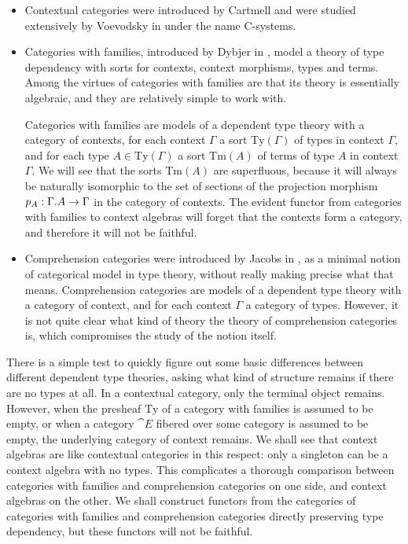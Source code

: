 \begin{itemize}
\item Contextual categories were introduced by Cartmell \cite{Cartmell1986} and were studied
extensively by Voevodsky in \cite{VV_Csys_univ,VV_C-systems_monad,VV_C-systems_quotients}
under the name C-systems.
\item Categories with families, introduced by Dybjer in \cite{Dybjer1996}, model a
theory of type dependency with sorts for contexts, context morphisms, types
and terms. Among the virtues of categories with families are that its theory
is essentially algebraic, and they are relatively simple to work with.

Categories with families are models of a dependent type theory with a
category of contexts, for each context $\Gamma$ a sort $\mathrm{Ty}(\Gamma)$ of
types in context $\Gamma$, and for each type $A\in\mathrm{Ty}(\Gamma)$ a sort
$\mathrm{Tm}(A)$ of terms of type $A$ in context $\Gamma$. We will see that
the sorts $\mathrm{Tm}(A)$ are superfluous, because it will always be 
naturally isomorphic to the set of sections of the projection morphism
$p_A:\ctxext{\Gamma}{A}\to\Gamma$ in the category of contexts. The evident
functor from categories with families to context algebras will forget that the contexts
form a category, and therefore it will not be faithful.
\item Comprehension categories were introduced by Jacobs in \cite{Jacobs1993}, as
a minimal notion of categorical model in type theory, without really making
precise what that means. 
Comprehension categories are models of a dependent type theory with a
category of context, and for each context $\Gamma$ a category of types.
However, it is not quite clear what kind of theory the theory of comprehension
categories is, which compromises the study of the notion itself.
\end{itemize}

There is a simple test to quickly figure out some basic differences between different
dependent type theories, asking what kind of structure remains if there are no
types at all. In a contextual category, only the terminal object remains.
However, when the presheaf $\mathrm{Ty}$ of a category with families is assumed
to be empty, or when a category $\cat{E}$ fibered over some category is assumed
to be empty, the underlying category of context remains. We shall see that
context algebras are like contextual categories in this respect: only a singleton can
be a context algebra with no types. This complicates a thorough comparison between
categories with families and comprehension categories on one side, and context algebras
on the other. We shall construct functors from the categories of categories with
families and comprehension categories directly preserving type dependency, but
these functors will not be faithful. 

